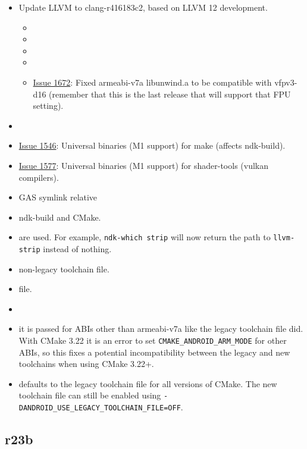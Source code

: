 \begin{itemize}
\tightlist
\item
  Update LLVM to clang-r416183c2, based on LLVM 12 development.

  \begin{itemize}
  \tightlist
  \item
  \item
  \item
  \item
  \item
    \href{https://github.com/android/ndk/issues/1672}{Issue 1672}: Fixed
    armeabi-v7a libunwind.a to be compatible with vfpv3-d16 (remember
    that this is the last release that will support that FPU setting).
  \end{itemize}
\item
\item
  \href{https://github.com/android/ndk/issues/1546}{Issue 1546}:
  Universal binaries (M1 support) for make (affects ndk-build).
\item
  \href{https://github.com/android/ndk/issues/1577}{Issue 1577}:
  Universal binaries (M1 support) for shader-tools (vulkan compilers).
\item
  GAS symlink relative
\item
  ndk-build and CMake.
\item
  are used. For example, \texttt{ndk-which\ strip} will now return the
  path to \texttt{llvm-strip} instead of nothing.
\item
  non-legacy toolchain file.
\item
  file.
\item
\item
  it is passed for ABIs other than armeabi-v7a like the legacy toolchain
  file did. With CMake 3.22 it is an error to set
  \texttt{CMAKE\_ANDROID\_ARM\_MODE} for other ABIs, so this fixes a
  potential incompatibility between the legacy and new toolchains when
  using CMake 3.22+.
\item
  defaults to the legacy toolchain file for all versions of CMake. The
  new toolchain file can still be enabled using
  \texttt{-DANDROID\_USE\_LEGACY\_TOOLCHAIN\_FILE=OFF}.
\end{itemize}

\hypertarget{r23b}{%
\subsection{r23b}\label{r23b}}

